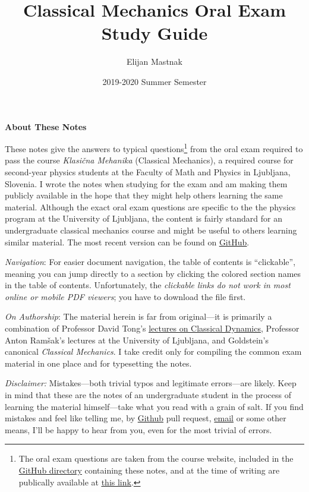 \documentclass[11pt, a4paper]{article}
\begin{document}
\title{Classical Mechanics Oral Exam Study Guide}
\author{Elijan Mastnak}
\date{2019-2020 Summer Semester}
\maketitle
\begin{center}
\textbf{About These Notes}
\end{center}
These notes give the answers to typical questions\footnote{The oral exam questions are taken from the course website, included in the \href{https://github.com/ejmastnak/fmf/tree/main/classical-mechanics/classical-mechanics-oral-study-guide}{\underline{GitHub directory}} containing these notes, and at the time of writing are publically available at \href{http://www-f1.ijs.si/~ramsak/KlasMeh/Izpitna.pdf}{\underline{this link}}.} from the oral exam required to pass the course \textit{Klasi\v{c}na Mehanika} (Classical Mechanics), a required course for second-year physics students at the Faculty of Math and Physics in Ljubljana, Slovenia. I wrote the notes when studying for the exam and am making them publicly available in the hope that they might help others learning the same material. Although the exact oral exam questions are specific to the the physics program at the University of Ljubljana, the content is fairly standard for an undergraduate classical mechanics course and might be useful to others learning similar material. The most recent version can be found on \href{https://github.com/ejmastnak/fmf/tree/main/classical-mechanics}{\underline{GitHub}}.

\vspace{2mm}
\textit{Navigation}: For easier document navigation, the table of contents is ``clickable'', meaning you can jump directly to a section by clicking the colored section names in the table of contents. Unfortunately, the \textit{clickable links do not work in most online or mobile PDF viewers}; you have to download the file first.

\vspace{2mm}
\textit{On Authorship}: The material herein is far from original---it is primarily a combination of Professor David Tong's \href{http://www.damtp.cam.ac.uk/user/tong/dynamics.html}{\underline{lectures on Classical Dynamics}}, Professor Anton Ram\v{s}ak's lectures at the University of Ljubljana, and Goldstein's canonical \textit{Classical Mechanics}. I take credit only for compiling the common exam material in one place and for typesetting the notes.

\vspace{2mm}
\textit{Disclaimer:} Mistakes---both trivial typos and legitimate errors---are likely. Keep in mind that these are the notes of an undergraduate student in the process of learning the material himself---take what you read with a grain of salt. If you find mistakes and feel like telling me, by \href{https://github.com/ejmastnak/fmf}{Github} pull request, \href{mailto:ejmastnak@gmail.com}{email} or some other means, I'll be happy to hear from you, even for the most trivial of errors.
\end{document}
